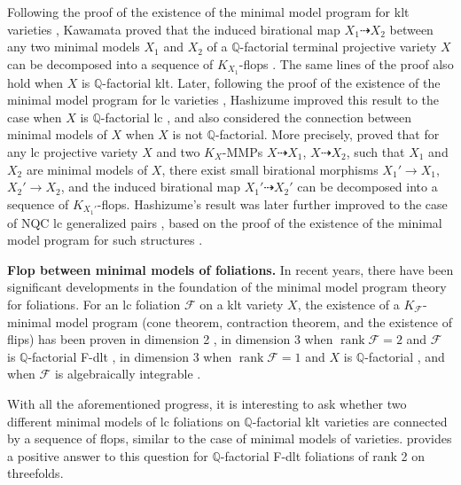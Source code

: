 \documentclass[preprint,12pt]{elsarticle}
\newcommand{\rk}{\operatorname{rank}}
\newcommand{\Ff}{\mathcal{F}}
\begin{document}
Following the proof of the existence of the minimal model program for klt varieties \cite{BCHM10}, Kawamata proved that the induced birational map $X_1 \dashrightarrow X_2$ between any two minimal models $X_1$ and $X_2$ of a $\mathbb{Q}$-factorial terminal projective variety $X$ can be decomposed into a sequence of $K_{X_1}$-flops \cite[Theorem 1]{Kaw08}. The same lines of the proof also hold when $X$ is $\mathbb{Q}$-factorial klt. Later, following the proof of the existence of the minimal model program for lc varieties \cite{Bir12, HX13, Has19}, Hashizume improved this result to the case when $X$ is $\mathbb{Q}$-factorial lc \cite{Has20}, and also considered the connection between minimal models of $X$ when $X$ is not $\mathbb{Q}$-factorial. More precisely, \cite[Theorem 1.1]{Has20} proved that for any lc projective variety $X$ and two $K_X$-MMPs $X\dashrightarrow X_1$, $X \dashrightarrow X_2$, such that $X_1$ and $X_2$ are minimal models of $X$, there exist small birational morphisms $X_1' \rightarrow X_1$, $X_2' \rightarrow X_2$, and the induced birational map $X_1' \dashrightarrow X_2'$ can be decomposed into a sequence of $K_{X_1'}$-flops. Hashizume's result was later further improved to the case of NQC lc generalized pairs \cite{Cha24}, based on the proof of the existence of the minimal model program for such structures \cite{HL23, LX23a, LX23b, Xie22}.

\medskip


\noindent\textbf{Flop between minimal models of foliations.} In recent years, there have been significant developments in the foundation of the minimal model program theory for foliations. For an lc foliation $ \mathcal{F} $ on a klt variety $ X $, the existence of a $ K_{\mathcal{F}} $-minimal model program (cone theorem, contraction theorem, and the existence of flips) has been proven in dimension 2 \cite{McQ08, Bru15}, in dimension 3 when $\rk\Ff=2$ and $ \mathcal{F} $ is $\mathbb{Q}$-factorial F-dlt \cite{Spi20, CS21, SS22}, in dimension 3 when $\rk\Ff=1$ and $ X $ is $\mathbb{Q}$-factorial \cite{CS20}, and when $ \mathcal{F} $ is algebraically integrable \cite{CHLX23, LMX24b, CHLMSSX24}.

With all the aforementioned progress, it is interesting to ask whether two different minimal models of lc foliations on $\mathbb{Q}$-factorial klt varieties are connected by a sequence of flops, similar to the case of minimal models of varieties. \cite[Theorem 1.1]{JV23} provides a positive answer to this question for $\mathbb{Q}$-factorial F-dlt foliations of rank 2 on threefolds.
\end{document}
